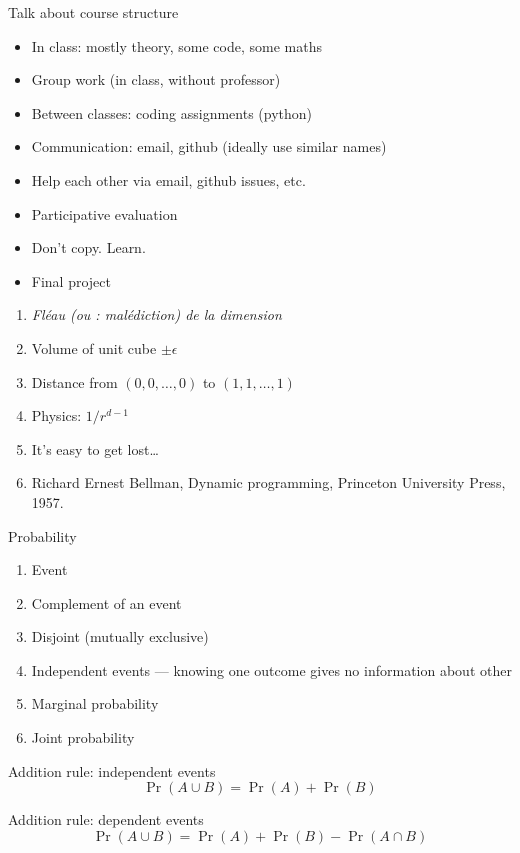 Talk about course structure
\begin{itemize}
\item In class: mostly theory, some code, some maths
\item Group work (in class, without professor)
\item Between classes: coding assignments (python)
\item Communication: email, github (ideally use similar names)
\item Help each other via email, github issues, etc.
\item Participative evaluation
\item Don't copy.  Learn.
\item Final project
\end{itemize}

\begin{enumerate}
\item \textit{Fléau (ou : malédiction) de la dimension}
\item Volume of unit cube $\pm\epsilon$
\item Distance from $(0,0,\ldots,0)$ to $(1,1,\ldots,1)$
\item Physics: $1/r^{d-1}$
\item It's easy to get lost\dots
\item Richard Ernest Bellman, Dynamic programming, Princeton
  University Press, 1957.
\end{enumerate}

Probability
\begin{enumerate}
\item Event
\item Complement of an event
\item Disjoint (mutually exclusive)
\item Independent events --- knowing one outcome gives no information about other
\item Marginal probability
\item Joint probability
\end{enumerate}

Addition rule: independent events
\begin{displaymath}
  \Pr(A\cup B) = \Pr(A) + \Pr(B)
\end{displaymath}

Addition rule: dependent events
\begin{displaymath}
  \Pr(A\cup B) = \Pr(A) + \Pr(B) - \Pr(A\cap B)
\end{displaymath}

